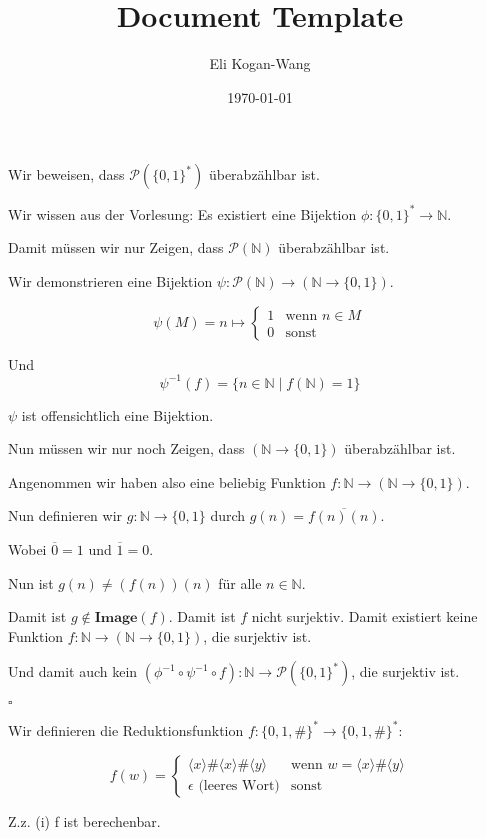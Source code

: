 \documentclass[a4paper,12pt]{article}
\title{Document Template}
\author{Eli Kogan-Wang}
\date{\today}
\newcommand{\qed}{\hfill$\square$}
\begin{document}
Wir beweisen, dass $\mathcal{P}(\{0,1\}^*)$ überabzählbar ist.

Wir wissen aus der Vorlesung: Es existiert eine Bijektion $\phi: \{0,1\}^*\rightarrow \mathbb{N}$.

Damit müssen wir nur Zeigen, dass $\mathcal{P}(\mathbb{N})$ überabzählbar ist.

Wir demonstrieren eine Bijektion $\psi: \mathcal{P}(\mathbb{N})\rightarrow (\mathbb{N}\rightarrow \{0,1\})$.

$$\psi(M) = n \mapsto \begin{cases} 1 & \text{wenn } n \in M \\ 0 & \text{sonst} \end{cases}$$

Und $$\psi^{-1}(f) = \{n \in \mathbb{N} \mid f(\mathbb{N}) = 1\}$$

$\psi$ ist offensichtlich eine Bijektion.

Nun müssen wir nur noch Zeigen, dass $(\mathbb{N}\rightarrow \{0,1\})$ überabzählbar ist.

Angenommen wir haben also eine beliebig Funktion $f: \mathbb{N}\rightarrow (\mathbb{N}\rightarrow \{0,1\})$.

Nun definieren wir $g: \mathbb{N}\rightarrow \{0,1\}$ durch $g(n) = \overline{f(n)(n)}$.

Wobei $\overline{0} = 1$ und $\overline{1} = 0$.

Nun ist $g(n) \neq (f(n))(n)$ für alle $n \in \mathbb{N}$.

Damit ist $g\notin \mathbf{Image}(f)$. Damit ist $f$ nicht surjektiv. Damit existiert keine Funktion
$f: \mathbb{N}\rightarrow (\mathbb{N}\rightarrow \{0,1\})$, die surjektiv ist.

Und damit auch kein $(\phi^{-1}\circ\psi^{-1}\circ f): \mathbb{N}\rightarrow \mathcal{P}(\{0,1\}^*)$, die surjektiv ist.

\qed

\vspace{5cm}

Wir definieren die Reduktionsfunktion $f: \{0,1,\#\}^* \rightarrow \{0,1,\#\}^*$:

$$f(w)=\begin{cases}
    \langle x\rangle\#\langle x\rangle\#\langle y\rangle & \text{wenn }w=\langle x\rangle\#\langle y\rangle \\
    \epsilon \text{ (leeres Wort)}                       & \text{sonst}
  \end{cases}$$

Z.z. (i) f ist berechenbar.
\end{document}
